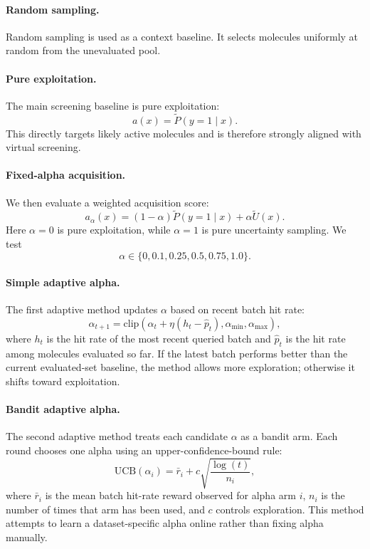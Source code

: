 \documentclass[10pt]{article}
\begin{document}
\paragraph{Random sampling.}
Random sampling is used as a context baseline. It selects molecules uniformly at random from the unevaluated pool.

\paragraph{Pure exploitation.}
The main screening baseline is pure exploitation:
\[
a(x)=\widetilde{P}(y=1 \mid x).
\]
This directly targets likely active molecules and is therefore strongly aligned with virtual screening.

\paragraph{Fixed-alpha acquisition.}
We then evaluate a weighted acquisition score:
\[
a_{\alpha}(x)=(1-\alpha)\widetilde{P}(y=1 \mid x)+\alpha\widetilde{U}(x).
\]
Here $\alpha=0$ is pure exploitation, while $\alpha=1$ is pure uncertainty sampling. We test
\[
\alpha \in \{0,0.1,0.25,0.5,0.75,1.0\}.
\]

\paragraph{Simple adaptive alpha.}
The first adaptive method updates $\alpha$ based on recent batch hit rate:
\[
\alpha_{t+1}=\mathrm{clip}\left(\alpha_t+\eta(h_t-\hat{p}_t),\alpha_{\min},\alpha_{\max}\right),
\]
where $h_t$ is the hit rate of the most recent queried batch and $\hat{p}_t$ is the hit rate among molecules evaluated so far. If the latest batch performs better than the current evaluated-set baseline, the method allows more exploration; otherwise it shifts toward exploitation.

\paragraph{Bandit adaptive alpha.}
The second adaptive method treats each candidate $\alpha$ as a bandit arm. Each round chooses one alpha using an upper-confidence-bound rule:
\[
\mathrm{UCB}(\alpha_i)=\bar{r}_i+c\sqrt{\frac{\log(t)}{n_i}},
\]
where $\bar{r}_i$ is the mean batch hit-rate reward observed for alpha arm $i$, $n_i$ is the number of times that arm has been used, and $c$ controls exploration. This method attempts to learn a dataset-specific alpha online rather than fixing alpha manually.
\end{document}
